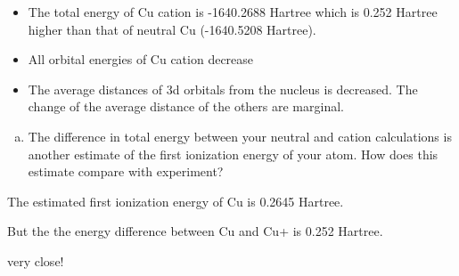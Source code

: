 \documentclass[11pt]{article}
\begin{document}
\begin{itemize}
\item The total energy of Cu cation is -1640.2688  Hartree which is 0.252 Hartree higher than that of neutral Cu (-1640.5208 Hartree).
\item All orbital energies of Cu cation decrease
\item The average distances of 3d orbitals from the nucleus is decreased. The change of the average distance of the others are marginal.
\end{itemize}

\begin{enumerate}[(f)]
\item The difference in total energy between your neutral and cation calculations is another estimate of the first ionization energy of your atom. How does this estimate compare with experiment?
\end{enumerate}
The estimated first ionization energy of Cu is 0.2645 Hartree.

But the the energy difference between Cu and Cu+ is 0.252 Hartree.

very close!
\end{document}
